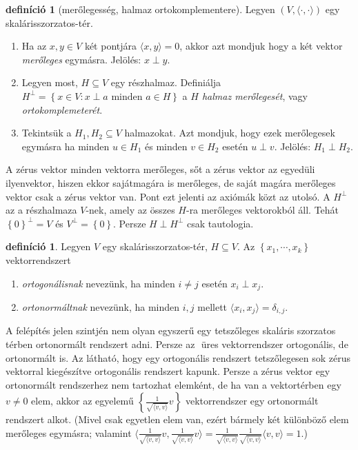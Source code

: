 \documentclass[a4paper, showtrims]{memoir}
\theoremstyle{plain}
\theoremstyle{remark}
\theoremstyle{definition}
\newtheorem{definition}[proposition]{definíció}
\newcommand{\ip}[2]{\langle#1,#2\rangle}
\begin{document}
\begin{definition}[merőlegesség, halmaz ortokomplementere]
	Legyen $\left( V,\ip{\cdot}{\cdot} \right)$ egy skalárisszor\-zatos-tér.
	\begin{enumerate}
		\item
		    Ha az $x,y\in V$ két pontjára $\ip{x}{y}=0$,
		    akkor azt mondjuk hogy a két vektor \emph{merőleges} egymásra.
		    Jelölés: $x\perp y$.
		\item
		    Legyen most, $H\subseteq V$ egy részhalmaz.
		    Definiálja
		    \(
		    H^{\perp}=\left\{ x\in V:x\perp a \text{ minden } a\in H \right\}
		    \)
		    a \emph{$H$ halmaz merőlegesét}, vagy \emph{ortokomplemeterét}.
        \item
            Tekintsük a $H_1,H_2\subseteq V$ halmazokat.
            Azt mondjuk, hogy ezek merőlegesek egymásra ha 
            minden $u\in H_1$ és minden $v\in H_2$ esetén $u\perp v$.
            Jelölés: $H_1\perp H_2$.
            \qedhere
	\end{enumerate}
\end{definition}
A zérus vektor minden vektorra merőleges, sőt a zérus vektor az egyedüli ilyenvektor, 
hiszen ekkor sajátmagára is merőleges, de saját magára merőleges vektor csak a zérus vektor van.
Pont ezt jelenti az axiómák közt az utolsó.
A $H^\perp$ az a részhalmaza $V$-nek, amely az összes $H$-ra merőleges vektorokból áll.
Tehát $\left\{ 0 \right\}^\perp = V$ és $V^{\perp}=\left\{ 0 \right\}$.
Persze $H\perp H^\perp$ csak tautologia.

\begin{definition}
	Legyen $V$ egy skalárisszorzatos-tér, $H\subseteq V$.
	Az $\left\{ x_1,\cdots,x_k \right\}$ vektorrendszert
	\begin{enumerate}
		\item \emph{ortogonálisnak} nevezünk, ha minden $i\neq j$ esetén
		      $x_i\perp x_j$.
		\item \emph{ortonormáltnak} nevezünk, ha minden $i,j$ mellett $\ip{x_i}{x_j}=\delta_{i,j}$.\qedhere
	\end{enumerate}
\end{definition}
A felépítés jelen szintjén nem olyan egyszerű egy tetszőleges skaláris szorzatos térben ortonormált rendszert
adni. Persze az ${}$ üres vektorrendszer ortogonális, de ortonormált is.
Az látható, hogy egy ortogonális rendszert tetszőlegesen sok zérus vektorral kiegészítve ortogonális rendszert kapunk.
Persze a zérus vektor egy ortonormált rendszerhez nem tartozhat elemként,
de ha van a vektortérben egy $v\neq 0$ elem,
akkor az egyelemű $\left\{ \frac{1}{\sqrt{\ip{v}{v}}}v \right\}$ vektorrendszer egy ortonormált rendszert alkot.
(Mivel csak egyetlen elem van, ezért bármely két különböző elem merőleges egymásra;
valamint
$\ip{\frac{1}{\sqrt{\ip{v}{v}}}v}{\frac{1}{\sqrt{\ip{v}{v}}}v}
	=
	\frac{1}{\sqrt{\ip{v}{v}}}
	\frac{1}{\sqrt{\ip{v}{v}}}
	\ip{v}{v}=1.
$)
\end{document}
